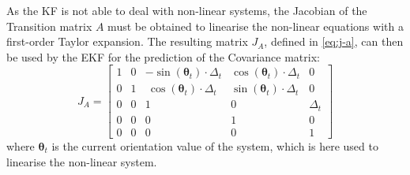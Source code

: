 As the \gls{KF} is not able to deal with non-linear systems, the Jacobian of the Transition matrix $A$ must be obtained to linearise the non-linear equations with a first-order Taylor expansion.
The resulting matrix $J_A$, defined in \eqref{eq:j-a}, can then be used by the \gls{EKF} for the prediction of the Covariance matrix:
\begin{equation}
	\label{eq:j-a}
	J_A
	=
	\begin{bmatrix}
		1 & 0 & -\sin(\boldsymbol \theta_t) \cdot \Delta_t & \cos(\boldsymbol \theta_t) \cdot \Delta_t & 0  \\
		0 & 1 & ~\cos(\boldsymbol \theta_t) \cdot \Delta_t & \sin(\boldsymbol \theta_t) \cdot \Delta_t &  0  \\
		0 & 0 & 1 & 0 & \Delta_t \\
		0 & 0 & 0 & 1 & 0  \\
		0 & 0 & 0 & 0 & 1  
	\end{bmatrix}
\end{equation}
where $\boldsymbol \theta_t$ is the current orientation value of the system, which is here used to linearise the non-linear system.


